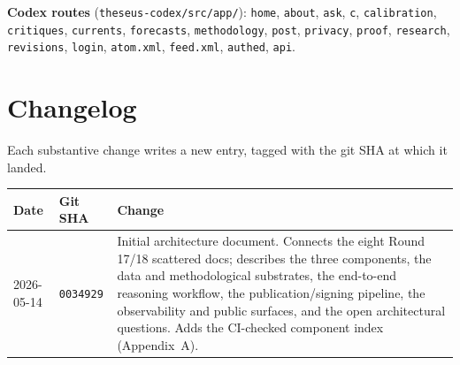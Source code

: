 \documentclass[11pt]{article}
\begin{document}
\textbf{Codex routes} (\texttt{theseus-codex/src/app/}):
\texttt{home}, \texttt{about}, \texttt{ask}, \texttt{c}, \texttt{calibration},
\texttt{critiques}, \texttt{currents}, \texttt{forecasts},
\texttt{methodology}, \texttt{post}, \texttt{privacy}, \texttt{proof},
\texttt{research}, \texttt{revisions}, \texttt{login}, \texttt{atom.xml},
\texttt{feed.xml}, \texttt{authed}, \texttt{api}.

\section*{Changelog}

Each substantive change writes a new entry, tagged with the git SHA at which
it landed.

\begin{longtable}{p{2.2cm} p{2.2cm} p{9.5cm}}
\textbf{Date} & \textbf{Git SHA} & \textbf{Change} \\
\hline
2026-05-14 & \texttt{0034929} & Initial architecture document. Connects the
eight Round 17/18 scattered docs; describes the three components, the data and
methodological substrates, the end-to-end reasoning workflow, the
publication/signing pipeline, the observability and public surfaces, and the
open architectural questions. Adds the CI-checked component index
(Appendix~A). \\
\end{longtable}
\end{document}
